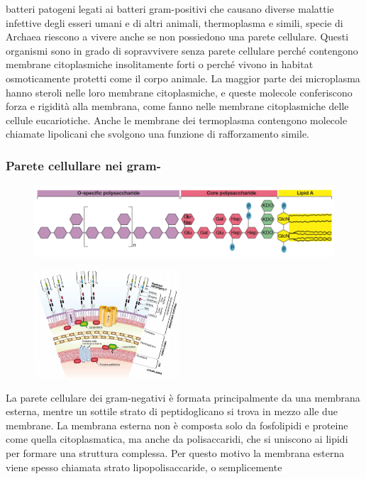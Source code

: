 batteri patogeni legati ai batteri gram-positivi che causano diverse malattie infettive degli esseri umani e di altri animali, thermoplasma e simili, 
specie di Archaea riescono a vivere anche se non possiedono una parete cellulare. Questi organismi sono in grado di sopravvivere senza parete cellulare perché contengono 
membrane citoplasmiche insolitamente forti o perché vivono in habitat osmoticamente protetti come il corpo animale. La maggior parte dei microplasma hanno 
steroli nelle loro membrane citoplasmiche, e queste molecole conferiscono forza e rigidità alla membrana, come fanno nelle membrane citoplasmiche delle 
cellule eucariotiche. Anche le membrane dei termoplasma contengono molecole chiamate lipolicani che svolgono una funzione di rafforzamento simile.
\subsubsection{Parete cellullare nei gram-}
\begin{figure}[H]
	\includegraphics[width=\textwidth]{Pictures/5.png}
\end{figure} 
\newpage
\begin{figure}
  \begin{center}
    \includegraphics[width=0.48\textwidth]{Pictures/6.png}
  \end{center}
\end{figure}
La parete cellulare dei gram-negativi è formata principalmente da una membrana esterna, mentre un sottile strato di peptidoglicano si trova in mezzo alle due 
membrane. La membrana esterna non è composta solo da fosfolipidi e proteine come quella citoplasmatica, ma anche da polisaccaridi, che si 
uniscono ai lipidi per formare una struttura complessa. Per questo motivo la membrana esterna viene spesso chiamata strato lipopolisaccaride, o semplicemente 
